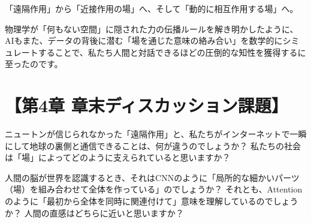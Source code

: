 「遠隔作用」から「近接作用の場」へ、そして「動的に相互作用する場」へ。

物理学が「何もない空間」に隠された力の伝播ルールを解き明かしたように、AIもまた、データの背後に潜む「場を通じた意味の絡み合い」を数学的にシミュレートすることで、私たち人間と対話できるほどの圧倒的な知性を獲得するに至ったのです。

\section*{【第4章 章末ディスカッション課題】}

ニュートンが信じられなかった「遠隔作用」と、私たちがインターネットで一瞬にして地球の裏側と通信できることは、何が違うのでしょうか？ 私たちの社会は「場」によってどのように支えられていると思いますか？

人間の脳が世界を認識するとき、それはCNNのように「局所的な細かいパーツ（場）を組み合わせて全体を作っている」のでしょうか？ それとも、Attentionのように「最初から全体を同時に関連付けて」意味を理解しているのでしょうか？ 人間の直感はどちらに近いと思いますか？




